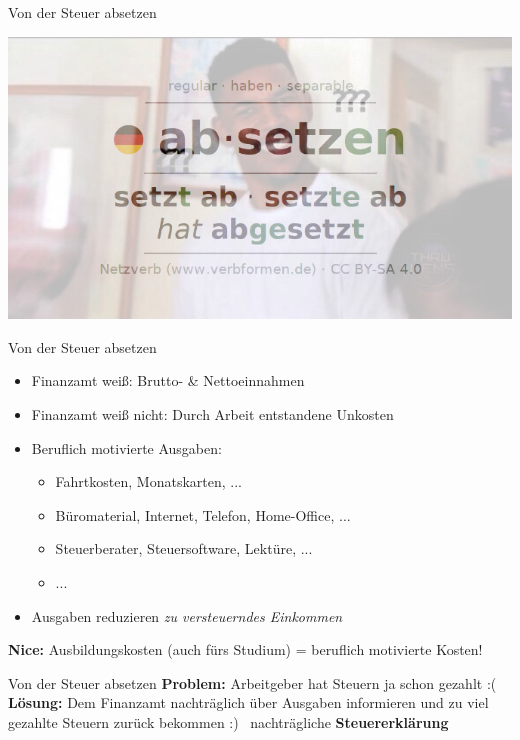 \documentclass{beamer}
\begin{document}
			\begin{frame}{Von der Steuer absetzen}
				\begin{center}
					\includegraphics[width=0.75\linewidth]{images/absetzen}
				\end{center}
			\end{frame}
		
			\begin{frame}{Von der Steuer absetzen}
				\begin{itemize}
					\item Finanzamt weiß: Brutto- \& Nettoeinnahmen
					\item Finanzamt weiß nicht: Durch Arbeit entstandene Unkosten
					\pause
					\item Beruflich motivierte Ausgaben:
					\begin{itemize}
						\item Fahrtkosten, Monatskarten, ...
						\item Büromaterial, Internet, Telefon, Home-Office, ...
						\item Steuerberater, Steuersoftware, Lektüre, ...
						\item ...
					\end{itemize}
					\item Ausgaben reduzieren \textit{zu versteuerndes Einkommen}
				\end{itemize}\n\pause
				
				\textbf{Nice:} Ausbildungskosten (auch fürs Studium) = beruflich motivierte Kosten!
			\end{frame}
				
			\begin{frame}{Von der Steuer absetzen}
				\textbf{Problem:} Arbeitgeber hat Steuern ja schon gezahlt :(\n
				\textbf{Lösung:} Dem Finanzamt nachträglich über Ausgaben informieren und zu viel gezahlte Steuern zurück bekommen  :)\n
				\textrightarrow\ nachträgliche \textbf{Steuererklärung}
			\end{frame}
		
\end{document}
